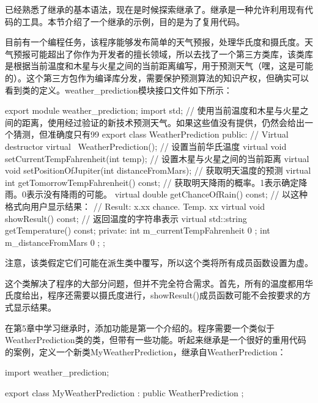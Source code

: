 
已经熟悉了继承的基本语法，现在是时候探索继承了。继承是一种允许利用现有代码的工具。本节介绍了一个继承的示例，目的是为了复用代码。


目前有一个编程任务，该程序能够发布简单的天气预报，处理华氏度和摄氏度。天气预报可能超出了你作为开发者的擅长领域，所以去找了一个第三方类库，该类库是根据当前温度和木星与火星之间的当前距离编写，用于预测天气（嘿，这是可能的）。这个第三方包作为编译库分发，需要保护预测算法的知识产权，但确实可以看到类的定义。weather\_prediction模块接口文件如下所示：

\begin{cpp}
export module weather_prediction;
import std;
// 使用当前温度和木星与火星之间的距离，使用经过验证的新技术预测天气。如果这些值没有提供，仍然会给出一个猜测，但准确度只有99%
export class WeatherPrediction
{
    public:
        // Virtual destructor
        virtual ~WeatherPrediction();
        // 设置当前华氏温度
        virtual void setCurrentTempFahrenheit(int temp);
        // 设置木星与火星之间的当前距离
        virtual void setPositionOfJupiter(int distanceFromMars);
        // 获取明天温度的预测
        virtual int getTomorrowTempFahrenheit() const;
        // 获取明天降雨的概率。1表示确定降雨。0表示没有降雨的可能。
        virtual double getChanceOfRain() const;
        // 以这种格式向用户显示结果：
        // Result: x.xx chance. Temp. xx
        virtual void showResult() const;
        // 返回温度的字符串表示
        virtual std::string getTemperature() const;
    private:
        int m_currentTempFahrenheit { 0 };
        int m_distanceFromMars { 0 };
};
\end{cpp}

注意，该类假定它们可能在派生类中覆写，所以这个类将所有成员函数设置为虚。

这个类解决了程序的大部分问题，但并不完全符合需求。首先，所有的温度都用华氏度给出，程序还需要以摄氏度进行，showResult()成员函数可能不会按要求的方式显示结果。


在第5章中学习继承时，添加功能是第一个介绍的。程序需要一个类似于WeatherPrediction类的类，但带有一些功能。听起来继承是一个很好的重用代码的案例，定义一个新类MyWeatherPrediction，继承自WeatherPrediction：

\begin{cpp}
import weather_prediction;

export class MyWeatherPrediction : public WeatherPrediction
{
};
\end{cpp}

